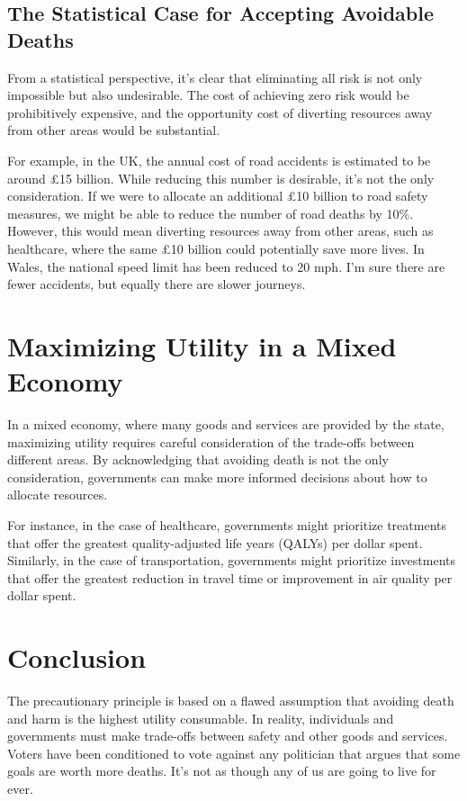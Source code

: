\documentclass{article}
\begin{document}
\subsection{The Statistical Case for Accepting Avoidable Deaths}

From a statistical perspective, it's clear that eliminating all risk is not only impossible but also undesirable. The cost of achieving zero risk would be prohibitively expensive, and the opportunity cost of diverting resources away from other areas would be substantial.

For example, in the UK, the annual cost of road accidents is estimated to be around £15 billion. While reducing this number is desirable, it's not the only consideration. If we were to allocate an additional £10 billion to road safety measures, we might be able to reduce the number of road deaths by 10\%. However, this would mean diverting resources away from other areas, such as healthcare, where the same £10 billion could potentially save more lives. In Wales, the national speed limit has been reduced to 20 mph. I'm sure there are fewer accidents, but equally there are slower journeys. 

\section{Maximizing Utility in a Mixed Economy}

In a mixed economy, where many goods and services are provided by the state, maximizing utility requires careful consideration of the trade-offs between different areas. By acknowledging that avoiding death is not the only consideration, governments can make more informed decisions about how to allocate resources. 

For instance, in the case of healthcare, governments might prioritize treatments that offer the greatest quality-adjusted life years (QALYs) per dollar spent. Similarly, in the case of transportation, governments might prioritize investments that offer the greatest reduction in travel time or improvement in air quality per dollar spent.

\section{Conclusion}

The precautionary principle is based on a flawed assumption that avoiding death and harm is the highest utility consumable. In reality, individuals and governments must make trade-offs between safety and other goods and services. Voters have been conditioned to vote against any politician that argues that some goals are worth more deaths. It's not as though any of us are going to live for ever. 
\end{document}
